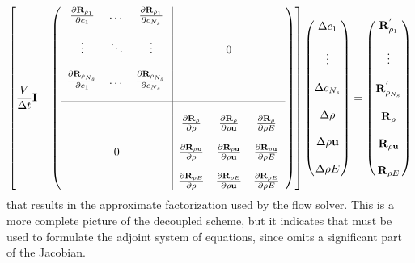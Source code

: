 \begin{equation}
  \left[ 
    \frac{V}{\Delta t} \mathbf I + 
    \left(
    \begin{array}{c c c | c c c }
      \frac{\partial \mathbf R_{\rho_1}}{\partial c_1}      & \dots  & \frac{\partial \mathbf R_{\rho_1}}{\partial c_{N_s}} & & & \\[12pt]
      \vdots                    & \ddots & \vdots                       & & 0 & \\[12pt]
      \frac{\partial \mathbf R_{\rho_{N_s}}}{\partial c_1}  & \dots  & \frac{\partial \mathbf R_{\rho_{N_s}}}{\partial c_{N_s}} & & & \\[12pt]
      \hline
      & & & & & \\
      & & & \frac{\partial \mathbf R_{\rho}}{\partial \rho}        & \frac{\partial \mathbf R_{\rho}}{\partial \rho \mathbf u}        &  \frac{\partial \mathbf R_{\rho}}{\partial \rho E}     \\[12pt]
      & 0 & & \frac{\partial \mathbf R_{\rho \mathbf u}}{\partial \rho}    & \frac{\partial \mathbf R_{\rho \mathbf u}}{\partial \rho \mathbf u}    &  \frac{\partial \mathbf R_{\rho \mathbf u}}{\partial \rho E} \\[12pt]
      & & & \frac{\partial \mathbf R_{\rho E}}{\partial \rho}      & \frac{\partial \mathbf R_{\rho E}}{\partial \rho \mathbf u}      &  \frac{\partial \mathbf R_{\rho E}}{\partial \rho E}
    \end{array}
    \right)
  \right]
  \begin{pmatrix}
    \Delta c_1      \\ \\
    \vdots     \\ \\
    \Delta c_{N_s}  \\ \\
    \Delta \rho     \\ \\
    \Delta \rho \mathbf u \\ \\
    \Delta \rho E
  \end{pmatrix}
  =
  \begin{pmatrix}
    \mathbf R_{\rho_1}^{'}     \\ \\
    \vdots               \\ \\
    \mathbf R_{\rho_{N_s}}^{'} \\ \\
    \mathbf R_{\rho}           \\ \\
    \mathbf R_{\rho \mathbf u}       \\ \\
    \mathbf R_{\rho E}
  \end{pmatrix}
  \label{dc-sparse-system}
\end{equation}
that results in the approximate factorization used by the flow solver.  This is
a more complete picture of the decoupled scheme, but it indicates that
 must be used to formulate the adjoint system of equations,
since  omits a significant part of the Jacobian.

